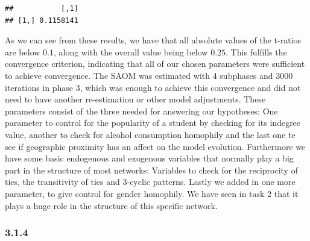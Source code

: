 \documentclass[
]{article}
\begin{document}
\begin{verbatim}
##           [,1]
## [1,] 0.1158141
\end{verbatim}

As we can see from these results, we have that all absolute values of
the t-ratios are below \(0.1\), along with the overall value being below
\(0.25\). This fulfills the convergence criterion, indicating that all
of our chosen parameters were sufficient to achieve convergence. The
SAOM was estimated with 4 subphases and 3000 iterations in phase 3,
which was enough to achieve this convergence and did not need to have
another re-estimation or other model adjustments. These parameters
consist of the three needed for answering our hypotheses: One parameter
to control for the popularity of a student by checking for its indegree
value, another to check for alcohol consumption homophily and the last
one te see if geographic proximity has an affect on the model evolution.
Furthermore we have some basic endogenous and exogenous variables that
normally play a big part in the structure of most networks: Variables to
check for the reciprocity of ties, the transitivity of ties and 3-cyclic
patterns. Lastly we added in one more parameter, to give control for
gender homophily. We have seen in task 2 that it plays a huge role in
the structure of this specific network.

\subsubsection{3.1.4}\label{section-13}
\end{document}
